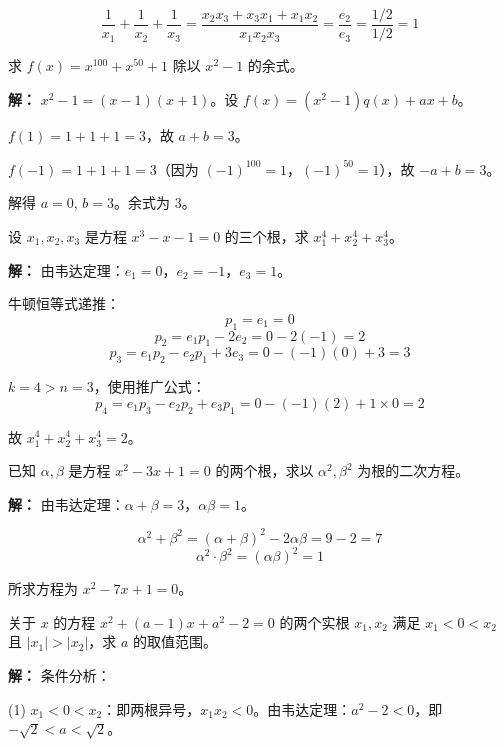 \documentclass[12pt, a4paper]{ctexart}
\begin{document}
\[
\frac{1}{x_1}+\frac{1}{x_2}+\frac{1}{x_3} = \frac{x_2x_3+x_3x_1+x_1x_2}{x_1x_2x_3} = \frac{e_2}{e_3} = \frac{1/2}{1/2} = 1
\]

\begin{examplebox}[【例题8】余数定理求余式]
求 $f(x) = x^{100} + x^{50} + 1$ 除以 $x^2 - 1$ 的余式。
\end{examplebox}

\textbf{解：} $x^2 - 1 = (x-1)(x+1)$。设 $f(x) = (x^2-1)q(x) + ax + b$。

$f(1) = 1+1+1 = 3$，故 $a+b=3$。

$f(-1) = 1+1+1 = 3$（因为 $(-1)^{100}=1$，$(-1)^{50}=1$），故 $-a+b=3$。

解得 $a=0,\, b=3$。余式为 $3$。

\begin{examplebox}[【例题9】牛顿恒等式求高次幂和]
设 $x_1, x_2, x_3$ 是方程 $x^3 - x - 1 = 0$ 的三个根，求 $x_1^4 + x_2^4 + x_3^4$。
\end{examplebox}

\textbf{解：} 由韦达定理：$e_1 = 0$，$e_2 = -1$，$e_3 = 1$。

牛顿恒等式递推：
\[
p_1 = e_1 = 0
\]
\[
p_2 = e_1 p_1 - 2e_2 = 0 - 2(-1) = 2
\]
\[
p_3 = e_1 p_2 - e_2 p_1 + 3e_3 = 0 - (-1)(0) + 3 = 3
\]

$k=4 > n=3$，使用推广公式：
\[
p_4 = e_1 p_3 - e_2 p_2 + e_3 p_1 = 0 - (-1)(2) + 1 \times 0 = 2
\]

故 $x_1^4 + x_2^4 + x_3^4 = 2$。

\begin{examplebox}[【例题10】构造多项式求根的表达式]
已知 $\alpha, \beta$ 是方程 $x^2 - 3x + 1 = 0$ 的两个根，求以 $\alpha^2, \beta^2$ 为根的二次方程。
\end{examplebox}

\textbf{解：} 由韦达定理：$\alpha+\beta=3$，$\alpha\beta=1$。

\[
\alpha^2+\beta^2 = (\alpha+\beta)^2 - 2\alpha\beta = 9-2 = 7
\]
\[
\alpha^2 \cdot \beta^2 = (\alpha\beta)^2 = 1
\]

所求方程为 $x^2 - 7x + 1 = 0$。

\begin{examplebox}
关于 $x$ 的方程 $x^2 + (a-1)x + a^2 - 2 = 0$ 的两个实根 $x_1, x_2$ 满足 $x_1 < 0 < x_2$ 且 $|x_1| > |x_2|$，求 $a$ 的取值范围。
\end{examplebox}

\textbf{解：} 条件分析：

(1) $x_1 < 0 < x_2$：即两根异号，$x_1 x_2 < 0$。由韦达定理：$a^2 - 2 < 0$，即 $-\sqrt{2} < a < \sqrt{2}$。
\end{document}
